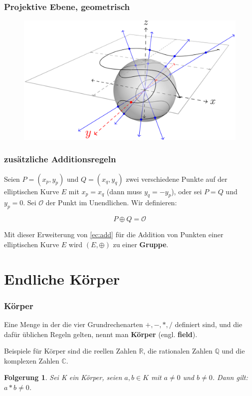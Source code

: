 \documentclass{beamer}
\newcommand{\Q}{\mathbb{Q}}
\newcommand{\R}{\mathbb{R}}
\newtheorem{folgerung}[theorem]{Folgerung}
\begin{document}
\begin{frame}
  \frametitle{Projektive Ebene, geometrisch}
  \begin{figure}
    \includegraphics[height=0.57\textwidth]{ell-curve-projective.png}
  \end{figure}
\end{frame}

\begin{frame}
  \frametitle{zusätzliche Additionsregeln}
  \begin{definition}
    Seien $P = (x_p, y_p)$ und $Q =(x_q, y_q)$ zwei verschiedene Punkte auf der
    elliptischen Kurve $E$ mit $x_p = x_q$ (dann muss $y_q = -y_p$),
    oder sei $P = Q$ und $y_p = 0$.
    Sei $\mathcal{O}$ der Punkt im Unendlichen. Wir definieren:

    $$ P \oplus Q = \mathcal{O} $$
  \end{definition}
  \begin{Theorem}
    Mit dieser Erweiterung von \eqref{ec:add} für die Addition von Punkten einer
    elliptischen Kurve $E$ wird $(E, \oplus)$ zu einer {\bf Gruppe}.
  \end{Theorem}
\end{frame}


\section{Endliche Körper}

\begin{frame}
  \frametitle{Körper}
  \begin{definition}
    Eine Menge in der die vier Grundrechenarten $+, -, *, /$ definiert sind,
    und die dafür üblichen Regeln gelten, nennt man {\bf Körper}
    (engl. {\bf field}).
  \end{definition}

  \pause
  Beispiele für Körper sind die reellen Zahlen $\R$, die rationalen
  Zahlen $\Q$ und die komplexen Zahlen $\mathbb{C}$.

  \pause
  \begin{folgerung}
    Sei K ein Körper, seien $a, b \in K$ mit $a \ne 0$ und $b \ne 0$.
    Dann gilt: $a * b \ne 0$.
  \end{folgerung}
\end{frame}
\end{document}

